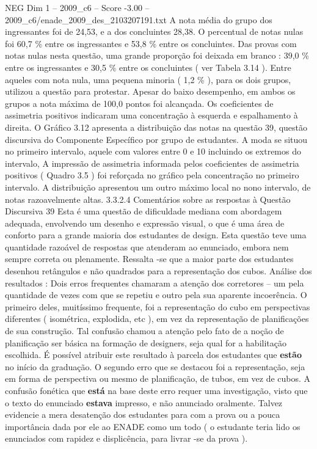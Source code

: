 \begin{textsample}{NEG Dim 1 – 2009\_c6 – Score -3.00 – 2009\_c6/enade\_2009\_des\_2103207191.txt}
A nota média do grupo dos ingressantes foi de 24,53, e a dos concluintes 28,38.
O percentual de notas nulas foi 60,7 \% entre os ingressantes e 53,8 \% entre os concluintes.
Das provas com notas nulas nesta questão, uma grande proporção foi deixada em branco : 39,0 \% entre os ingressantes e 30,5 \% entre os concluintes ( ver Tabela 3.14 ).
Entre aqueles com nota nula, uma pequena minoria ( 1,2 \% ), para os dois grupos, utilizou a questão para protestar.
Apesar do baixo desempenho, em ambos os grupos a nota máxima de 100,0 pontos foi alcançada.
Os coeficientes de assimetria positivos indicaram uma concentração à esquerda e espalhamento à direita.
O Gráfico 3.12 apresenta a distribuição das notas na questão 39, questão discursiva do Componente Específico por grupo de estudantes.
A moda se situou no primeiro intervalo, aquele com valores entre 0 e 10 incluindo os extremos do intervalo, A impressão de assimetria informada pelos coeficientes de assimetria positivos ( Quadro 3.5 ) foi reforçada no gráfico pela concentração no primeiro intervalo.
A distribuição apresentou um outro máximo local no nono intervalo, de notas razoavelmente altas. 3.3.2.4 Comentários sobre as respostas à Questão Discursiva 39 Esta é uma questão de dificuldade mediana com abordagem adequada, envolvendo um desenho e expressão visual, o que é uma área de conforto para a grande maioria dos estudantes de design.
Esta questão teve uma quantidade razoável de respostas que atenderam ao enunciado, embora nem sempre correta ou plenamente.
Ressalta -se que a maior parte dos estudantes desenhou retângulos e não quadrados para a representação dos cubos.
Análise dos resultados : Dois erros frequentes chamaram a atenção dos corretores – um pela quantidade de vezes com que se repetiu e outro pela sua aparente incoerência.
O primeiro deles, muitíssimo frequente, foi a representação do cubo em perspectivas diferentes ( isométrica, explodida, etc ), em vez da representação de planificações de sua construção.
Tal confusão chamou a atenção pelo fato de a noção de planificação ser básica na formação de designers, seja qual for a habilitação escolhida.
É possível atribuir este resultado à parcela dos estudantes que \textbf{estão} no início da graduação.
O segundo erro que se destacou foi a representação, seja em forma de perspectiva ou mesmo de planificação, de tubos, em vez de cubos.
A confusão fonética que \textbf{está} na base deste erro requer uma investigação, visto que o texto do enunciado \textbf{estava} impresso, e não anunciado oralmente.
Talvez evidencie a mera desatenção dos estudantes para com a prova ou a pouca importância dada por ele ao ENADE como um todo ( o estudante teria lido os enunciados com rapidez e displicência, para livrar -se da prova ).

\end{textsample}
